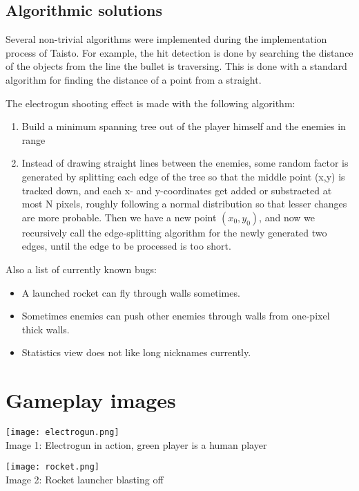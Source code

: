 \documentclass[a4paper,12pt,titlepage]{article}
\begin{document}
\subsection {Algorithmic solutions}
Several non-trivial algorithms were implemented during the implementation 
process of Taisto. For example, the hit detection is done by searching the 
distance of the objects from the line the bullet is traversing. This is done
with a standard algorithm for finding the distance of a point from a straight.

The electrogun shooting effect is made with the following algorithm:
\begin{enumerate}
\item Build a minimum spanning tree out of the player himself and the enemies
in range
\item Instead of drawing straight lines between the enemies, some random factor
is generated by splitting each edge of the tree so that the middle point (x,y)
is tracked down, and each x- and y-coordinates get added or substracted at most
N pixels, roughly following a normal distribution so that lesser changes are
more probable. Then we have a new point $(x_0,y_0)$, and now we recursively
call the edge-splitting algorithm for the newly generated two edges, until the
edge to be processed is too short.
\end{enumerate}

Also a list of currently known bugs:
\begin{itemize}
\item A launched rocket can fly through walls sometimes.
\item Sometimes enemies can push other enemies through walls from one-pixel thick
walls.
\item Statistics view does not like long nicknames currently.
\end{itemize}


\appendix
\section{Gameplay images}
\begin{center}
\texttt{[image: electrogun.png]}
\\
Image 1: Electrogun in action, green player is a human player
\end{center}
\begin{center}
\texttt{[image: rocket.png]}
\\
Image 2: Rocket launcher blasting off
\end{center}
\end{document}
